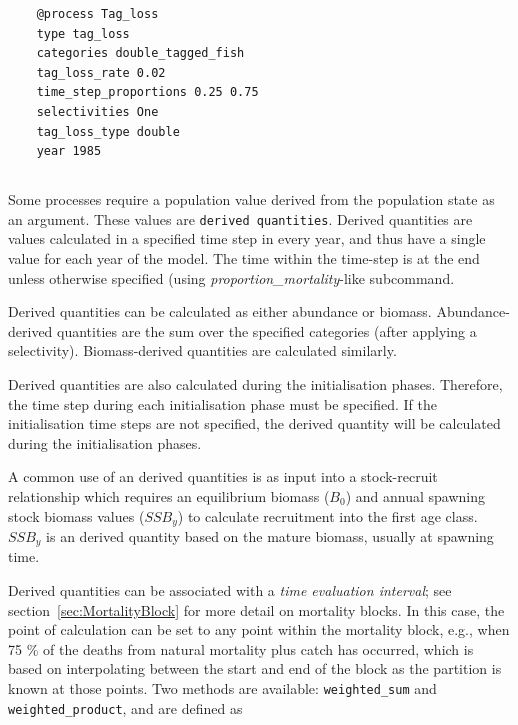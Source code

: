 {\small{\begin{verbatim}
	@process Tag_loss
	type tag_loss
	categories double_tagged_fish
	tag_loss_rate 0.02
	time_step_proportions 0.25 0.75
	selectivities One
	tag_loss_type double
	year 1985
\end{verbatim}}}
\subsection{\label{sec:DerivedQuantity}}

Some processes require a population value derived from the population state as an argument. These values are \texttt{derived quantities}. Derived quantities are values calculated in a specified time step in every year, and thus have a single value for each year of the model. The time within the time-step is at the end unless otherwise specified (using \textit{proportion\_mortality}-like subcommand.

Derived quantities can be calculated as either abundance or biomass. Abundance-derived quantities are the sum over the specified categories (after applying a selectivity)\label{sec:DerivedQuantity-Abundance}. Biomass-derived quantities are calculated similarly\label{sec:DerivedQuantity-Biomass}.

Derived quantities are also calculated during the initialisation phases. Therefore, the time step during each initialisation phase must be specified. If the initialisation time steps are not specified, the derived quantity will be calculated during the initialisation phases. 

A common use of an derived quantities is as input into a stock-recruit relationship  which requires an equilibrium biomass ($B_0$) and annual spawning stock biomass values ($SSB_y$) to calculate recruitment into the first age class. $SSB_y$ is an derived quantity based on the mature biomass, usually at spawning time.

Derived quantities can be associated with a \textit{time evaluation interval}; see section~\ref{sec:MortalityBlock} for more detail on mortality blocks. In this case, the point of calculation can be set to any point within the mortality block, e.g., when 75 \% of the deaths from natural mortality plus catch has occurred, which is based on interpolating between the start and end of the block as the partition is known at those points.  Two  methods are available: \texttt{weighted\_sum} and \texttt{weighted\_product}, and are defined as

